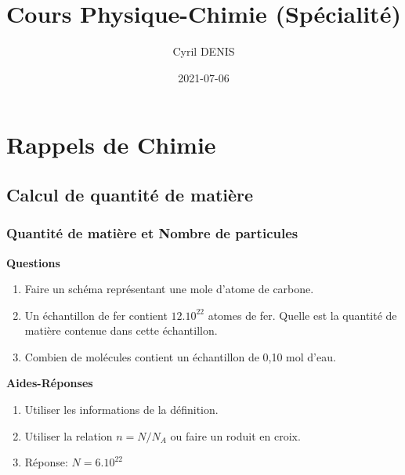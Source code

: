 \documentclass[
]{book}
\title{Cours Physique-Chimie (Spécialité)}
\author{Cyril DENIS}
\date{2021-07-06}
\providecommand{\tightlist}{%
  \setlength{\itemsep}{0pt}\setlength{\parskip}{0pt}}
\def\tightlist{}
\begin{document}
\maketitle

{
\setcounter{tocdepth}{1}
\tableofcontents
}
\hypertarget{rappels-de-chimie}{%
\chapter{Rappels de Chimie}\label{rappels-de-chimie}}

\hypertarget{calcul-de-quantituxe9-de-matiuxe8re}{%
\section{Calcul de quantité de matière}\label{calcul-de-quantituxe9-de-matiuxe8re}}

\hypertarget{quantituxe9-de-matiuxe8re-et-nombre-de-particules}{%
\subsection{Quantité de matière et Nombre de particules}\label{quantituxe9-de-matiuxe8re-et-nombre-de-particules}}

\begin{blackbox}

\begin{center}
\textbf{Questions}

\end{center}

\begin{enumerate}
\def\labelenumi{\arabic{enumi}.}
\tightlist
\item
  Faire un schéma représentant une mole d'atome de carbone.
\item
  Un échantillon de fer contient \(12.10^{22}\) atomes de fer. Quelle est la quantité de matière contenue dans cette échantillon.
\item
  Combien de molécules contient un échantillon de 0,10 mol d'eau.
\end{enumerate}

\end{blackbox}

\textbf{Aides-Réponses}

\begin{enumerate}
\def\labelenumi{\arabic{enumi}.}
\tightlist
\item
  Utiliser les informations de la définition.
\item
  Utiliser la relation \(n=N / N_A\) ou faire un roduit en croix.
\item
  Réponse: \(N=6.10^{22}\)
\end{enumerate}
\end{document}
